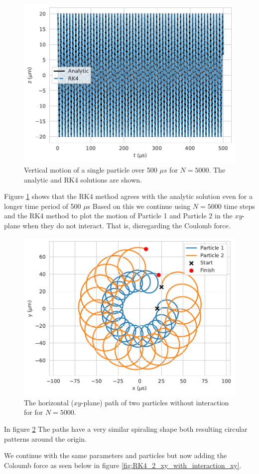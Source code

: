\documentclass[english,notitlepage,reprint,nofootinbib]{revtex4-1}  %
\begin{document}
\begin{figure}[H]
    \centering
    \includegraphics[width=.5\textwidth]{../figures/analytic_RK4_t_axis_2_N5000.pdf}
    \caption{Vertical motion of a single particle over 500 $\mu s$ for $N=5000$. The analytic and RK4 solutions are shown.}
    \label{fig:analytic_RK4_t_axis_2_N5000}
\end{figure}

Figure \ref{fig:analytic_RK4_t_axis_2_N5000} shows that the RK4 method agrees with the analytic solution even for a longer time period of 500 $\mu$s
Based on this we continue using $N=5000$ time steps and the RK4 method to plot the motion of Particle 1 and Particle 2 in the $xy$-plane when they do not interact.
That is, disregarding the Coulomb force.
\begin{figure}[H]
    \centering
    \includegraphics[width=.5\textwidth]{../figures/2p_N5000_RK4_xy.pdf}
    \caption{The horizontal ($xy$-plane) path of two particles without interaction for for $N = 5000$.}
    \label{fig:RK4_2_xy_no_interaction_xy}
\end{figure}
In figure \ref{fig:RK4_2_xy_no_interaction_xy}
The paths have a very similar spiraling shape both resulting circular patterns around the origin.

We continue with the same parameters and particles but now adding the Coloumb force as seen below in figure \ref{fig:RK4_2_xy_with_interaction_xy}.
\end{document}
